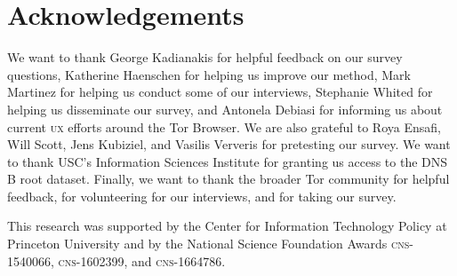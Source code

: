 \section*{Acknowledgements}

We want to thank George Kadianakis for helpful feedback on our survey questions,
Katherine Haenschen for helping us improve our method, Mark Martinez for helping
us conduct some of our interviews, Stephanie Whited for helping us disseminate
our survey, and Antonela Debiasi for informing us about current \textsc{ux}
efforts around the Tor Browser.  We are also grateful to Roya Ensafi, Will
Scott, Jens Kubiziel, and Vasilis Ververis for pretesting our survey.  We want
to thank USC's Information Sciences Institute for granting us access to the DNS
B root dataset.  Finally, we want to thank the broader Tor community for helpful
feedback, for volunteering for our interviews, and for taking our survey.

This research was supported by the Center for Information Technology Policy at
Princeton University and by the National Science Foundation Awards
\textsc{cns}-1540066, \textsc{cns}-1602399, and \textsc{cns}-1664786.

